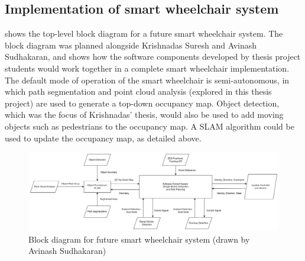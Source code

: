 \subsection{Implementation of smart wheelchair system}

 shows the top-level block diagram for a future
smart wheelchair system. The block diagram was planned alongside Krishnadas Suresh and
Avinash Sudhakaran, and shows how the software components developed by thesis project students
would work together in a complete smart wheelchair implementation. The default mode of operation
of the smart wheelchair is semi-autonomous, in which path segmentation and point cloud analysis
(explored in this thesis project) are used to generate a top-down occupancy map. Object detection,
which was the focus of Krishnadas' thesis, would also be used to add moving objects such as
pedestrians to the occupancy map. A SLAM algorithm could be used to update the occupancy map, as detailed above.

\begin{figure}[b]
    \centering
    \includegraphics[width=\linewidth]{images/top_level_software_pipeline.png}
    \caption{Block diagram for future smart wheelchair system (drawn by Avinash Sudhakaran)}
    \label{fig:top_level_software_pipeline}
\end{figure}



